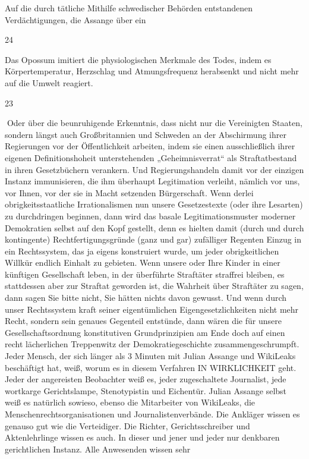 \begin{multicols}{2}
Auf die durch tätliche Mithilfe schwedischer Behörden
entstandenen Verdächtigungen, die Assange über ein

24

Das Opossum imitiert die physiologischen Merkmale des Todes, indem es Körpertemperatur, Herzschlag und
Atmungsfrequenz herabsenkt und nicht mehr auf die Umwelt reagiert.

23

Oder über die beunruhigende Erkenntnis, dass nicht
nur die Vereinigten Staaten, sondern längst auch Großbritannien und Schweden an der Abschirmung ihrer
Regierungen vor der Öffentlichkeit arbeiten, indem sie
einen ausschließlich ihrer eigenen Definitionshoheit
unterstehenden „Geheimnisverrat“ als Straftatbestand
in ihren Gesetzbüchern verankern. Und Regierungshandeln damit vor der einzigen Instanz immunisieren, die
ihm überhaupt Legitimation verleiht, nämlich vor uns,
vor Ihnen, vor der sie in Macht setzenden Bürgerschaft.
Wenn derlei obrigkeitsstaatliche Irrationalismen nun
unsere Gesetzestexte (oder ihre Lesarten) zu durchdringen beginnen, dann wird das basale Legitimationsmuster moderner Demokratien selbst auf den Kopf gestellt,
denn es hielten damit (durch und durch kontingente)
Rechtfertigungsgründe (ganz und gar) zufälliger Regenten Einzug in ein Rechtssystem, das ja eigens konstruiert
wurde, um jeder obrigkeitlichen Willkür endlich Einhalt
zu gebieten.
Wenn unsere oder Ihre Kinder in einer künftigen Gesellschaft leben, in der überführte Straftäter straffrei bleiben, es stattdessen aber zur Straftat geworden ist, die
Wahrheit über Straftäter zu sagen, dann sagen Sie bitte
nicht, Sie hätten nichts davon gewusst.
Und wenn durch unser Rechtssystem kraft seiner eigentümlichen Eigengesetzlichkeiten nicht mehr Recht, sondern sein genaues Gegenteil entstünde, dann wären die
für unsere Gesellschaftsordnung konstitutiven Grundprinzipien am Ende doch auf einen recht lächerlichen
Treppenwitz der Demokratiegeschichte zusammengeschrumpft.
Jeder Mensch, der sich länger als 3 Minuten mit Julian
Assange und WikiLeaks beschäftigt hat, weiß, worum es
in diesem Verfahren IN WIRKLICHKEIT geht. Jeder der
angereisten Beobachter weiß es, jeder zugeschaltete
Journalist, jede wortkarge Gerichtslampe, Stenotypistin
und Eichentür. Julian Assange selbst weiß es natürlich
sowieso, ebenso die Mitarbeiter von WikiLeaks, die Menschenrechtsorganisationen und Journalistenverbände.
Die Ankläger wissen es genauso gut wie die Verteidiger.
Die Richter, Gerichtsschreiber und Aktenlehrlinge wissen es auch. In dieser und jener und jeder nur denkbaren gerichtlichen Instanz. Alle Anwesenden wissen sehr

\end{multicols}
